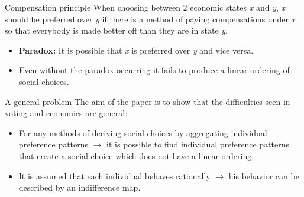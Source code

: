 \documentclass{beamer}
\begin{document}
\begin{frame}{Compensation principle}
    When choosing between 2 economic states \textit{x} and \textit{y}, \textit{x} should be preferred over \textit{y} if there is a method of paying compensations under \textit{x} so that everybody is made better off than they are in state \textit{y}.
    \vspace{0.25 cm}
    \begin{itemize}
        \item \textbf{Paradox:} It is possible that \textit{x} is preferred over \textit{y} and vice versa.
        \item Even without the paradox occurring \uline{it fails to produce a linear ordering of social choices.}
    \end{itemize}

    
\end{frame}

\begin{frame}{A general problem}
    The aim of the paper is to show that the difficulties seen in voting and economics are general:
    \begin{itemize}
        \item For any methods of deriving social choices by aggregating individual preference patterns $\rightarrow$ it is possible to find individual preference patterns that create a social choice which does not have a linear ordering.
        \item It is assumed that each individual behaves rationally $\rightarrow$ his behavior can be described by an indifference map.
    \end{itemize}
        
\end{frame}

\end{document}
